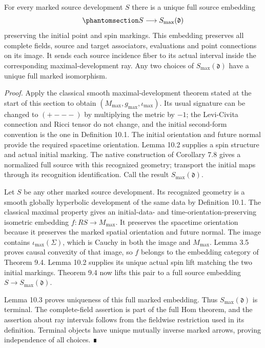 \documentclass[
  english,
  11pt,
  reqno]{amsart}
\begin{document}
For every marked source development \(S\) there is a unique full source
embedding
\begin{equation}\protect\phantomsection\label{eq:global-maximal-source-universal-arrow}{
S\longrightarrow S_{\max}(\mathfrak d)
}\end{equation} preserving the initial point and spin markings. This
embedding preserves all complete fields, source and target associators,
evaluations and point connections on its image. It sends each source
incidence fiber to its actual interval inside the corresponding
maximal-development ray. Any two choices of \(S_{\max}(\mathfrak d)\)
have a unique full marked isomorphism.

\emph{Proof.} Apply the classical smooth maximal-development theorem
stated at the start of this section to obtain
\((M_{\max},g_{\max},\iota_{\max})\). Its usual signature can be changed
to \((+---)\) by multiplying the metric by \(-1\); the Levi-Civita
connection and Ricci tensor do not change, and the initial second-form
convention is the one in Definition 10.1. The initial orientation and
future normal provide the required spacetime orientation. Lemma 10.2
supplies a spin structure and actual initial marking. The native
construction of Corollary 7.8 gives a normalized full source with this
recognized geometry; transport the initial maps through its recognition
identification. Call the result \(S_{\max}(\mathfrak d)\).

Let \(S\) be any other marked source development. Its recognized
geometry is a smooth globally hyperbolic development of the same data by
Definition 10.1. The classical maximal property gives an initial-data-
and time-orientation-preserving isometric embedding
\(f:RS\to M_{\max}\). It preserves the spacetime orientation because it
preserves the marked spatial orientation and future normal. The image
contains \(\iota_{\max}(\Sigma)\), which is Cauchy in both the image and
\(M_{\max}\). Lemma 3.5 proves causal convexity of that image, so \(f\)
belongs to the embedding category of Theorem 9.4. Lemma 10.2 supplies
its unique actual spin lift matching the two initial markings. Theorem
9.4 now lifts this pair to a full source embedding
\(S\to S_{\max}(\mathfrak d)\).

Lemma 10.3 proves uniqueness of this full marked embedding. Thus
\(S_{\max}(\mathfrak d)\) is terminal. The complete-field assertion is
part of the full Hom theorem, and the assertion about ray intervals
follows from the fieldwise restriction used in its definition. Terminal
objects have unique mutually inverse marked arrows, proving independence
of all choices. ∎
\end{document}
